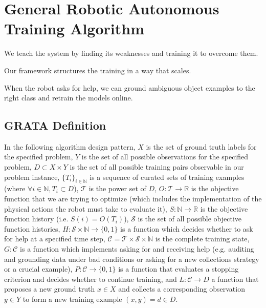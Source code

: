 \documentclass[conference]{IEEEtran}
\begin{document}
\section{General Robotic Autonomous Training Algorithm}
\label{sec:training}
We teach the system by finding its weaknesses and training it to overcome them.

Our framework structures the training in a way that scales. 

When the robot asks for help, we can ground ambiguous object examples to the right class
and retrain the models online.

\subsection{GRATA Definition}

In the following algorithm design pattern, 
$X$ is the set of ground truth labels for the specified problem,
$Y$ is the set of all possible observations for the specified problem,
\mbox{$D \subset X \times Y$} is the set of all possible training pairs observable in our problem instance,
\mbox{$\{T_i\}_{i \in \mathbb{N}}$} is a sequence of curated sets of training examples (where \mbox{$\forall i \in \mathbb{N}, T_i \subset D$}),  
$\mathcal{T}$ is the power set of $D$,
\mbox{$O: \mathcal{T} \to \mathbb{R}$} is the objective function that we are trying to optimize 
(which includes the implementation of the physical actions the robot must take to evaluate it),
\mbox{$S: \mathbb{N} \to \mathbb{R}$} is the objective function history (i.e. \mbox{$S(i) = O(T_i)$}),
$\mathcal{S}$ is the set of all possible objective function histories,
\mbox{$H: \mathcal{S} \times \mathbb{N} \to \{0,1\}$} is a function which decides whether to ask for help at
a specified time step,
\mbox{$\mathcal{C} = \mathcal{T} \times \mathcal{S} \times \mathbb{N}$} is the complete training state,
\mbox{$G: \mathcal{C}$} is a function which implements asking for and receiving help (e.g. auditing and grounding data under bad conditions
or asking for a new collections strategy or a crucial example),
\mbox{$P: \mathcal{C} \to \{0,1\}$} is a function that evaluates a stopping criterion and decides whether to continue training,
and \mbox{$L: \mathcal{C} \to D$} a function that proposes a new ground truth $x \in X$ and collects a corresponding observation $y \in Y$ to form
a new training example \mbox{$(x,y) = d \in D$}. 
\end{document}
